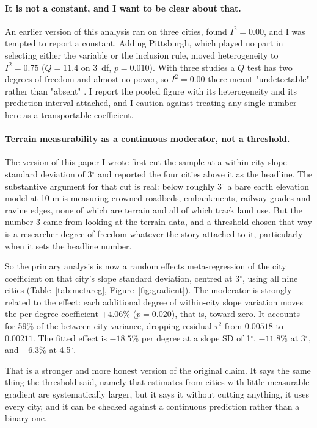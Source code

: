 \documentclass[11pt,letterpaper]{article}
\begin{document}
\paragraph{It is not a constant, and I want to be clear about that.} An earlier
version of this analysis ran on three cities, found $I^2 = 0.00$, and I was tempted to
report a constant. Adding Pittsburgh, which played no part in selecting either the
variable or the inclusion rule, moved heterogeneity to $I^2 = 0.75$ ($Q = 11.4$ on
3~df, $p = 0.010$). With three studies a $Q$ test has two degrees of freedom and
almost no power, so $I^2 = 0.00$ there meant "undetectable" rather than "absent"
\cite{higgins2002}. I report the pooled figure with its heterogeneity and its
prediction interval attached, and I caution against treating any single number here
as a transportable coefficient.

\paragraph{Terrain measurability as a continuous moderator, not a threshold.} The
version of this paper I wrote first cut the sample at a within-city slope standard
deviation of 3$^\circ$ and reported the four cities above it as the headline. The
substantive argument for that cut is real: below roughly 3$^\circ$ a bare earth
elevation model at 10 m is measuring crowned roadbeds, embankments, railway grades
and ravine edges, none of which are terrain and all of which track land use. But the
number 3 came from looking at the terrain data, and a threshold chosen that way is a
researcher degree of freedom whatever the story attached to it, particularly when it
sets the headline number.

So the primary analysis is now a random effects meta-regression of the city
coefficient on that city's slope standard deviation, centred at 3$^\circ$, using all
nine cities (Table~\ref{tab:metareg}, Figure~\ref{fig:gradient}). The moderator is
strongly related to the effect: each additional degree of within-city slope
variation moves the per-degree coefficient $+4.06\%$ ($p = 0.020$), that is, toward
zero. It accounts for 59\% of the between-city variance, dropping residual $\tau^2$
from $0.00518$ to $0.00211$. The fitted effect is $-18.5\%$ per degree at a slope SD
of 1$^\circ$, $-11.8\%$ at 3$^\circ$, and $-6.3\%$ at 4.5$^\circ$.

That is a stronger and more honest version of the original claim. It says the same
thing the threshold said, namely that estimates from cities with little measurable
gradient are systematically larger, but it says it without cutting anything, it uses
every city, and it can be checked against a continuous prediction rather than a
binary one.
\end{document}
